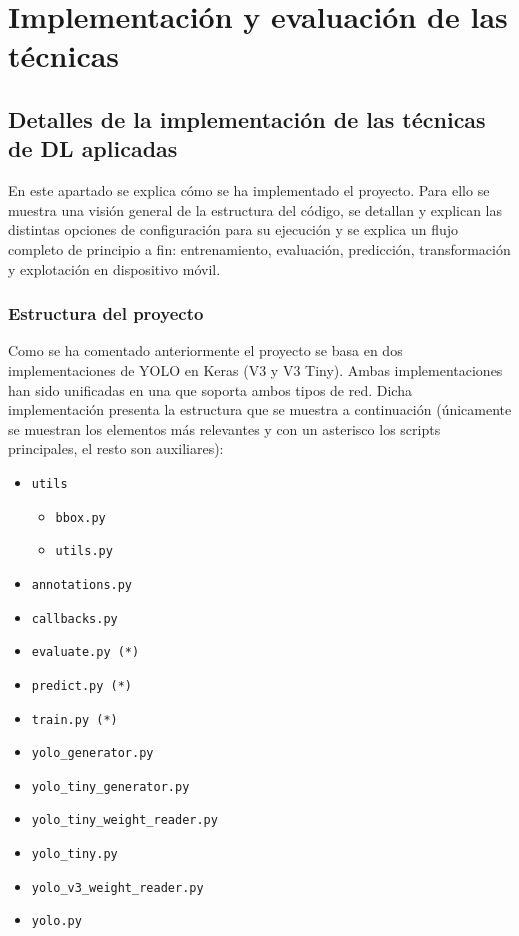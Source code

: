 \section{Implementación y evaluación de las técnicas}
\label{sec:implementacion_y_evaluacion_de_las_tecnicas}

\subsection{Detalles de la implementación de las técnicas de DL aplicadas}

En este apartado se explica cómo se ha implementado el proyecto. Para ello se muestra una visión general de la estructura del código, se detallan y explican las distintas opciones de configuración para su ejecución y se explica un flujo completo de principio a fin: entrenamiento, evaluación, predicción, transformación y explotación en dispositivo móvil.

\subsubsection*{Estructura del proyecto}

Como se ha comentado anteriormente el proyecto se basa en dos implementaciones de YOLO en Keras (V3 y V3 Tiny). Ambas implementaciones han sido unificadas en una \cite{s3_yolo_dicastro} que soporta ambos tipos de red. Dicha implementación presenta la estructura que se muestra a continuación (únicamente se muestran los elementos más relevantes y con un asterisco los scripts principales, el resto son auxiliares):

\begin{itemize}
	\item \texttt{utils}
	\begin{itemize}
		\item \texttt{bbox.py}
		\item \texttt{utils.py}
	\end{itemize}
	\item \texttt{annotations.py}
	\item \texttt{callbacks.py}
	\item \texttt{evaluate.py (*)}
	\item \texttt{predict.py (*)}
	\item \texttt{train.py (*)}
	\item \texttt{yolo\_generator.py}
	\item \texttt{yolo\_tiny\_generator.py}
	\item \texttt{yolo\_tiny\_weight\_reader.py}
	\item \texttt{yolo\_tiny.py}
	\item \texttt{yolo\_v3\_weight\_reader.py}
	\item \texttt{yolo.py}
\end{itemize}

